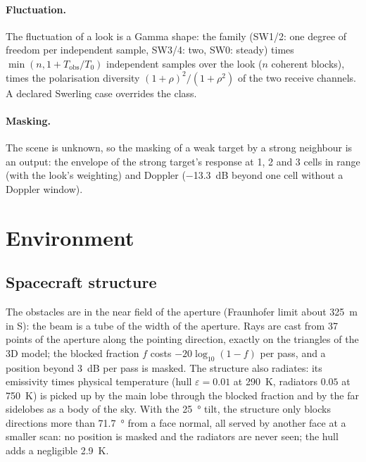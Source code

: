 \documentclass[11pt,a4paper]{article}
\begin{document}
\paragraph{Fluctuation.} The fluctuation of a look is a Gamma shape: the family (SW1/2: one degree of freedom per
independent sample, SW3/4: two, SW0: steady) times $\min(n, 1 + T_{\mathrm{obs}}/T_0)$ independent samples over the
look ($n$ coherent blocks), times the polarisation diversity $(1+\rho)^2/(1+\rho^2)$ of the two receive channels.
A declared Swerling case overrides the class.

\paragraph{Masking.} The scene is unknown, so the masking of a weak target by a strong neighbour is an output: the
envelope of the strong target's response at 1, 2 and 3 cells in range (with the look's weighting) and Doppler
(\SI{-13.3}{dB} beyond one cell without a Doppler window).

\section{Environment}\label{sec:env}

\subsection{Spacecraft structure}
The obstacles are in the near field of the aperture (Fraunhofer limit about \SI{325}{m} in S): the beam is a tube of
the width of the aperture. Rays are cast from 37 points of the aperture along the pointing direction, exactly on the
triangles of the 3D model; the blocked fraction $f$ costs $-20\log_{10}(1-f)$ per pass, and a position beyond
\SI{3}{dB} per pass is masked. The structure also radiates: its emissivity times physical temperature (hull
$\varepsilon = 0.01$ at \SI{290}{K}, radiators $0.05$ at \SI{750}{K}) is picked up by the main lobe through the
blocked fraction and by the far sidelobes as a body of the sky. With the \SI{25}{\degree} tilt, the structure only
blocks directions more than \SI{71.7}{\degree} from a face normal, all served by another face at a smaller scan: no
position is masked and the radiators are never seen; the hull adds a negligible \SI{2.9}{K}.
\end{document}
